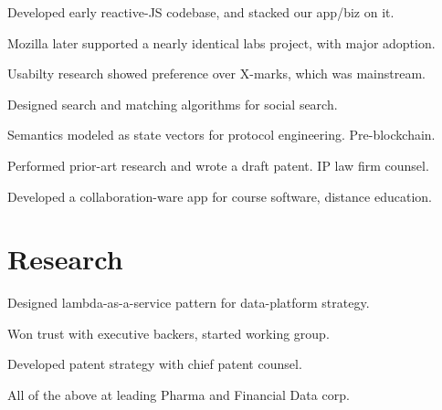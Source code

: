 \documentclass[letterpaper]{deedy-resume} %
\begin{document}
\begin{minipage}[t]{0.66\textwidth}
\begin{tightitemize}
\end{tightitemize}

\sectionspace %


\begin{tightitemize}
\item Developed early reactive-JS codebase, and stacked our app/biz on it. 
\item Mozilla later supported a nearly identical labs project, with major adoption.
\item Usabilty research showed preference over X-marks, which was mainstream.
\end{tightitemize}

\sectionspace %



\begin{tightitemize}
\item Designed search and matching algorithms for social search.
\item Semantics modeled as state vectors for protocol engineering.  Pre-blockchain.
\item Performed prior-art research and wrote a draft patent. IP law firm counsel.
\item Developed a collaboration-ware app for course software, distance education.
\end{tightitemize}

\sectionspace %



\section{Research}



\begin{tightitemize}
\item Designed lambda-as-a-service pattern for data-platform strategy.
\item Won trust with executive backers, started working group.
\item Developed patent strategy with chief patent counsel.
\item All of the above at leading Pharma and Financial Data corp.
\end{tightitemize}


\end{minipage}
\end{document}
